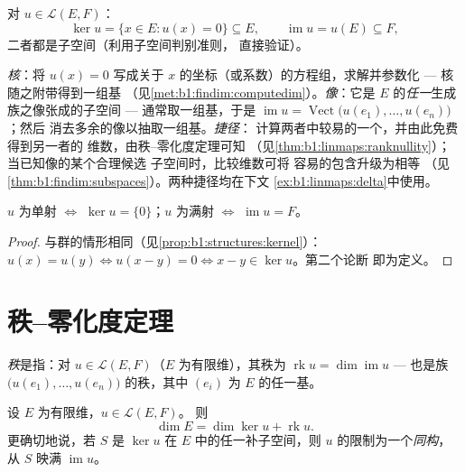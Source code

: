 \begin{definition}[核与像]\label{def:b1:linmaps:kerim}
对 $u \in \mathcal{L}(E, F)$：
\[
\ker u = \{x \in E : u(x) = 0\} \subseteq E,
\qquad
\operatorname{im} u = u(E) \subseteq F ,
\]
二者都是子空间（利用子空间判别准则，
直接验证）。
\end{definition}

\begin{method}[核与像的实际求法]
\label{met:b1:linmaps:kerim}
\emph{核}：将 $u(x) = 0$ 写成关于
$x$ 的坐标（或系数）的方程组，求解并参数化 --- 核
随之附带得到一组基
（见\cref{met:b1:findim:computedim}）。\emph{像}：它是
$E$ 的\emph{任一}生成族之像张成的子空间 ---
通常取一组基，于是 $\operatorname{im} u =
\operatorname{Vect}\bigl(u(e_1), \dots, u(e_n)\bigr)$；然后
消去多余的像以抽取一组基。\emph{捷径}：
计算两者中较易的一个，并由此免费得到另一者的
维数，由秩--零化度定理可知
（见\cref{thm:b1:linmaps:ranknullity}）；当已知像的某个合理候选
子空间时，比较维数可将
容易的包含升级为相等
（见\cref{thm:b1:findim:subspaces}）。两种捷径均在下文
\cref{ex:b1:linmaps:delta}中使用。
\end{method}

\begin{proposition}\label{prop:b1:linmaps:kernel}
$u$ 为单射 $\iff$ $\ker u = \{0\}$；$u$ 为满射 $\iff$
$\operatorname{im} u = F$。
\end{proposition}

\begin{proof}
与群的情形相同（见\cref{prop:b1:structures:kernel}）：$u(x) = u(y) \iff
u(x - y) = 0 \iff x - y \in \ker u$。第二个论断
即为定义。
\end{proof}

\section{秩--零化度定理}

\begin{definition}\label{def:b1:linmaps:rank}
\emph{秩}是指：对 $u \in \mathcal{L}(E,
F)$（$E$ 为有限维），其秩为 $\operatorname{rk} u = \dim
\operatorname{im} u$ --- 也是族
$\bigl(u(e_1), \dots, u(e_n)\bigr)$ 的秩，其中 $(e_i)$ 为 $E$ 的任一基。
\end{definition}

\begin{theorem}[秩--零化度定理]\label{thm:b1:linmaps:ranknullity}
设 $E$ 为有限维，$u \in \mathcal{L}(E, F)$。
则
\[
\dim E = \dim \ker u + \operatorname{rk} u .
\]
更确切地说，若 $S$ 是 $\ker u$ 在
$E$ 中的任一补子空间，则 $u$ 的限制为一个\emph{同构}，从 $S$ 映满
$\operatorname{im} u$。
\end{theorem}

